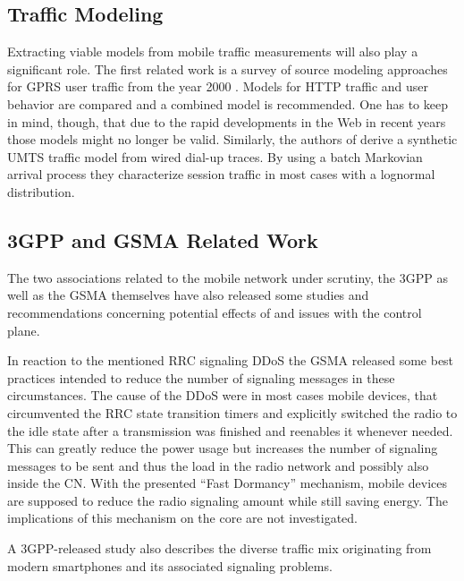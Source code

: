 \subsection{Traffic Modeling}

Extracting viable models from mobile traffic measurements will also play a significant role. The first related work is a survey of source modeling approaches for \gls{GPRS} user traffic from the year 2000 \cite{staehle2000source}. Models for \gls{HTTP} traffic and user behavior are compared and a combined model is recommended. One has to keep in mind, though, that due to the rapid developments in the Web in recent years those models might no longer be valid. Similarly, the authors of \cite{965876} derive a synthetic \gls{UMTS} traffic model from wired dial-up traces. By using a batch Markovian arrival process they characterize session traffic in most cases with a lognormal distribution.


\subsection{\texorpdfstring{\acrshort{3GPP}}{3GPP} and \texorpdfstring{\acrshort{GSMA}}{GSMA} Related Work}

The two associations related to the mobile network under scrutiny, the \gls{3GPP} as well as the \gls{GSMA} themselves have also released some studies and recommendations concerning potential effects of and issues with the control plane. 

In reaction to the mentioned \gls{RRC} signaling \gls{DDoS} the \gls{GSMA} released some best practices \cite{gsma2011fdbestpract} intended to reduce the number of signaling messages in these circumstances. The cause of the \gls{DDoS} were in most cases mobile devices, that circumvented the \gls{RRC} state transition timers and explicitly switched the radio to the idle state after a transmission was finished and reenables it whenever needed. This can greatly reduce the power usage but increases the number of signaling messages to be sent and thus the load in the radio network and possibly also inside the \gls{CN}. With the presented ``Fast Dormancy'' mechanism, mobile devices are supposed to reduce the radio signaling amount while still saving energy. The implications of this mechanism on the core are not investigated.

A \gls{3GPP}-released study \cite{3gpp.22.801} also describes the diverse traffic mix originating from modern smartphones and its associated signaling problems.

